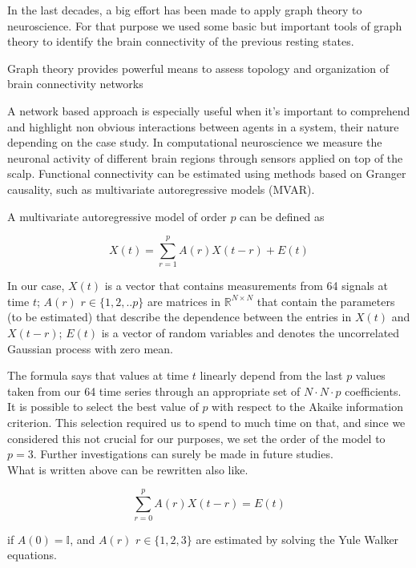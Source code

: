 \documentclass[%
 aip,
 jmp,%
 amsmath,amssymb,
 reprint,%
]{revtex4-1}
\begin{document}
In the last decades, a big effort has been made to apply graph theory to neuroscience. For that purpose we used some basic but important tools of graph theory to identify the brain connectivity of the previous resting states.

Graph theory provides powerful means to assess topology and organization of brain connectivity networks

A network based approach is especially useful when it's important to comprehend and highlight non obvious interactions between agents in a system, their nature depending on the case study. In computational neuroscience we measure the neuronal activity of different brain regions through sensors applied on top of the scalp. Functional connectivity can be estimated using methods based on Granger causality, such as multivariate autoregressive models (MVAR).

A multivariate autoregressive model of order $p$ can be defined as 

\begin{equation}
	X(t) = \sum_{r = 1}^{p} A(r)X(t-r) + E(t)
\end{equation}

In our case, $X(t)$ is a vector that contains measurements from 64 signals at time $t$; $A(r)$ $r\in \{1,2,..p\}$ are matrices in $\mathbb{R}^{N\times N}$ that contain the parameters (to be estimated) that describe the dependence between the entries in $X(t)$ and $X(t-r)$; $E(t)$ is a vector of random variables and denotes the uncorrelated Gaussian process with zero mean.

The formula says that values at time $t$ linearly depend from the last $p$ values taken from our 64 time series through an appropriate set of $N \cdot N \cdot p$ coefficients.\\

It is possible to select the best value of $p$ with respect to the Akaike information criterion. This selection required us to spend to much time on that, and since we considered this not crucial for our purposes, we set the order of the model to $p = 3$. Further investigations can surely be made in future studies.\cite{DengfengHuang}\\

What is written above can be rewritten also like.

\begin{equation}
	\sum_{r = 0}^{p} A(r)X(t-r) = E(t)
\end{equation}

if $A(0) = \mathbb{I}$, and $A(r)$ $r\in \{1,2,3\}$ are estimated by solving the Yule Walker equations. \\
\end{document}
